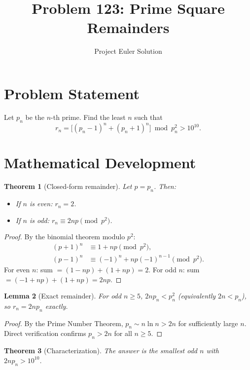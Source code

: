 \documentclass[11pt,a4paper]{article}
\title{Problem 123: Prime Square Remainders}
\author{Project Euler Solution}
\date{}
\newtheorem{theorem}{Theorem}
\newtheorem{lemma}[theorem]{Lemma}
\begin{document}
\maketitle

\section{Problem Statement}

Let $p_n$ be the $n$-th prime. Find the least $n$ such that
\[
r_n = \bigl[(p_n - 1)^n + (p_n + 1)^n\bigr] \bmod p_n^2 > 10^{10}.
\]

\section{Mathematical Development}

\begin{theorem}[Closed-form remainder]
Let $p = p_n$. Then:
\begin{itemize}
\item If $n$ is even: $r_n = 2$.
\item If $n$ is odd: $r_n \equiv 2np \pmod{p^2}$.
\end{itemize}
\end{theorem}

\begin{proof}
By the binomial theorem modulo $p^2$:
\begin{align*}
(p+1)^n &\equiv 1 + np \pmod{p^2}, \\
(p-1)^n &\equiv (-1)^n + np(-1)^{n-1} \pmod{p^2}.
\end{align*}
For even $n$: sum $= (1 - np) + (1 + np) = 2$. For odd $n$: sum $= (-1 + np) + (1 + np) = 2np$.
\end{proof}

\begin{lemma}[Exact remainder]
For odd $n \ge 5$, $2np_n < p_n^2$ (equivalently $2n < p_n$), so $r_n = 2np_n$ exactly.
\end{lemma}

\begin{proof}
By the Prime Number Theorem, $p_n \sim n \ln n > 2n$ for sufficiently large $n$. Direct verification confirms $p_n > 2n$ for all $n \ge 5$.
\end{proof}

\begin{theorem}[Characterization]
The answer is the smallest odd $n$ with $2np_n > 10^{10}$.
\end{theorem}
\end{document}
